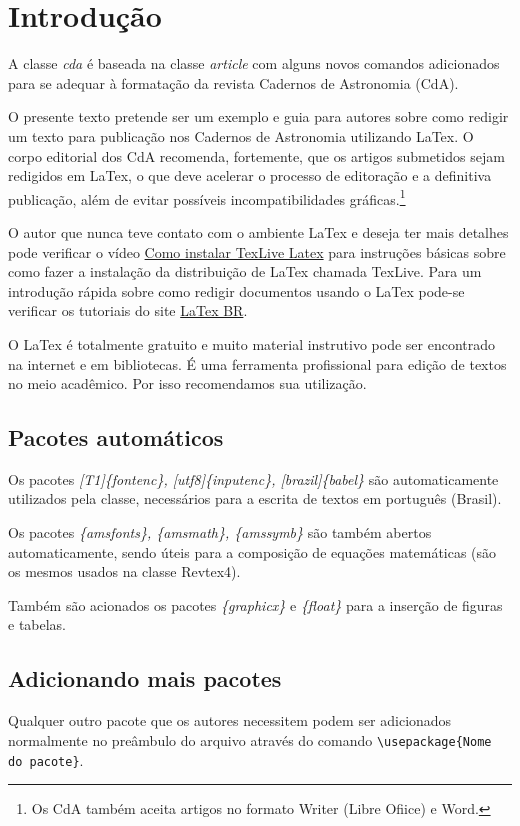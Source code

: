 \documentclass{cda}
\begin{document}
\section{Introdução}
A classe \textit{cda} é baseada na classe \textit{article} com alguns novos comandos adicionados para se adequar à formatação da revista Cadernos de Astronomia (CdA).

O presente texto pretende ser um exemplo e guia para autores sobre como redigir um texto para publicação nos Cadernos de Astronomia utilizando LaTex. O corpo editorial dos CdA recomenda, fortemente, que os artigos submetidos sejam redigidos em LaTex, o que deve acelerar o processo de editoração e a definitiva publicação, além de evitar possíveis incompatibilidades gráficas.\footnote{Os CdA também aceita artigos no formato Writer (Libre Ofiice) e Word.}

O autor que nunca teve contato com o ambiente LaTex e deseja ter mais detalhes pode verificar o vídeo \href{https://youtu.be/T9Q64dAzW20}{Como instalar TexLive Latex} para instruções básicas sobre como fazer a instalação da distribuição de LaTex chamada TexLive. Para um introdução rápida sobre como redigir documentos usando o LaTex pode-se verificar os tutoriais do site \href{http://latexbr.blogspot.com/2012/09/bibliografia-com-bibtex.html}{LaTex BR}. 

O LaTex é totalmente gratuito e muito material instrutivo pode ser encontrado na internet e em bibliotecas. É uma ferramenta profissional para edição de textos no meio acadêmico. Por isso recomendamos sua utilização.

\subsection{Pacotes automáticos}

Os pacotes \textit{[T1]\{fontenc\}, [utf8]\{inputenc\}, [brazil]\{babel\}} são automaticamente utilizados pela classe, necessários para a escrita de textos em português (Brasil).

Os pacotes \textit{\{amsfonts\}, \{amsmath\}, \{amssymb\}} são também abertos automaticamente, sendo úteis para a composição de equações matemáticas (são os mesmos usados na classe Revtex4).

Também são acionados os pacotes \textit{\{graphicx\}} e \textit{\{float\}} para a inserção de figuras e tabelas.

\subsection{Adicionando mais pacotes}
Qualquer outro pacote que os autores necessitem podem ser adicionados normalmente no preâmbulo do arquivo através do comando \verb|\usepackage{Nome do pacote}|.
\end{document}
